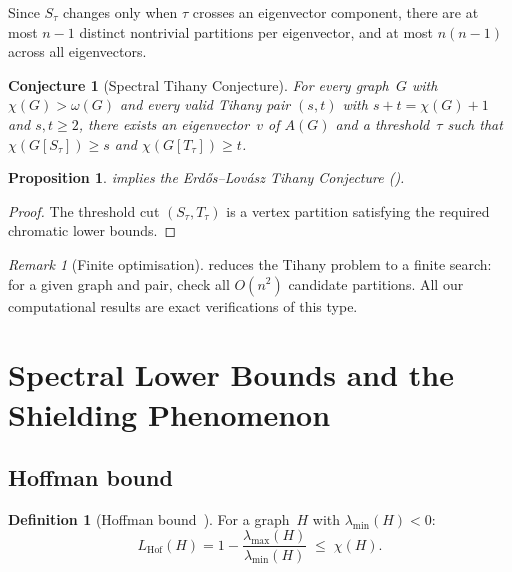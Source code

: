 \documentclass[11pt]{amsart}
\newtheorem{proposition}[theorem]{Proposition}
\newtheorem{conjecture}[theorem]{Conjecture}
\theoremstyle{definition}
\newtheorem{definition}[theorem]{Definition}
\theoremstyle{remark}
\newtheorem{remark}[theorem]{Remark}
\begin{document}
Since $S_\tau$ changes only when $\tau$ crosses an eigenvector component, 
there are at most $n-1$ distinct nontrivial partitions per eigenvector, 
and at most $n(n-1)$ across all eigenvectors.

\begin{conjecture}[Spectral Tihany Conjecture]\label{conj:spectral-tihany}
For every graph~$G$ with $\chi(G) > \omega(G)$ and every valid Tihany 
pair $(s,t)$ with $s + t = \chi(G) + 1$ and $s, t \ge 2$, there 
exists an eigenvector~$v$ of $A(G)$ and a threshold~$\tau$ such that 
$\chi(G[S_\tau]) \ge s$ and $\chi(G[T_\tau]) \ge t$.
\end{conjecture}

\begin{proposition}\label{prop:spectral-implies-tihany}
 implies the Erd\H{o}s--Lov\'asz Tihany 
Conjecture ().
\end{proposition}

\begin{proof}
The threshold cut $(S_\tau, T_\tau)$ is a vertex partition satisfying 
the required chromatic lower bounds.
\end{proof}

\begin{remark}[Finite optimisation]\label{rmk:finite-opt}
 reduces the Tihany problem to a finite 
search: for a given graph and pair, check all $O(n^2)$ candidate 
partitions.  All our computational results are exact verifications 
of this type.
\end{remark}


\section{Spectral Lower Bounds and the Shielding Phenomenon}
\label{sec:bounds}

\subsection{Hoffman bound}

\begin{definition}[Hoffman bound~\cite{hoffman-1970}]\label{def:hoffman}
For a graph~$H$ with $\lambda_{\min}(H) < 0$:
\[
  L_{\mathrm{Hof}}(H) = 1 - \frac{\lambda_{\max}(H)}{\lambda_{\min}(H)} 
  \;\le\; \chi(H).
\]
\end{definition}
\end{document}
